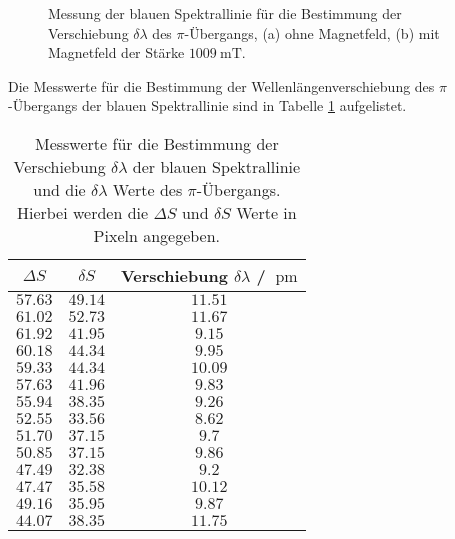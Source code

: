 \FloatBarrier
\begin{figure}
    \centering
    \vspace{0.1\textwidth}
    \caption{Messung der blauen Spektrallinie für die Bestimmung der Verschiebung $\delta \lambda$ des $\pi$-Übergangs, (a) ohne Magnetfeld, (b) mit Magnetfeld der Stärke $\SI{1009}{\milli\tesla}$.}
    \label{fig:blau_pi}
\end{figure}
\FloatBarrier
Die Messwerte für die Bestimmung der Wellenlängenverschiebung des $\pi$-Übergangs der blauen Spektrallinie sind in 
Tabelle \ref{tab:blau_pi} aufgelistet.
\FloatBarrier
\begin{table}
    \centering
    \caption{Messwerte für die Bestimmung der Verschiebung $\delta \lambda$ der blauen Spektrallinie und die $\delta\lambda$ Werte des $\pi$-Übergangs. Hierbei werden die $\Delta S$ und $\delta S$ Werte in Pixeln angegeben.}
    \label{tab:blau_pi}
    \begin{tabular}{c c c}
        \toprule
        $\Delta S$&$\delta S$&Verschiebung $\delta \lambda$ / $\SI{}{\pico\meter}$\\
        \midrule 
        $\num{57.63}$&$\num{49.14}$&$\num{11.51}$\\
        $\num{61.02}$&$\num{52.73}$&$\num{11.67}$\\
        $\num{61.92}$&$\num{41.95}$&$\num{9.15}$\\
        $\num{60.18}$&$\num{44.34}$&$\num{9.95}$\\
        $\num{59.33}$&$\num{44.34}$&$\num{10.09}$\\
        $\num{57.63}$&$\num{41.96}$&$\num{9.83}$\\
        $\num{55.94}$&$\num{38.35}$&$\num{9.26}$\\
        $\num{52.55}$&$\num{33.56}$&$\num{8.62}$\\
        $\num{51.70}$&$\num{37.15}$&$\num{9.7}$\\
        $\num{50.85}$&$\num{37.15}$&$\num{9.86}$\\
        $\num{47.49}$&$\num{32.38}$&$\num{9.2}$\\
        $\num{47.47}$&$\num{35.58}$&$\num{10.12}$\\
        $\num{49.16}$&$\num{35.95}$&$\num{9.87}$\\
        $\num{44.07}$&$\num{38.35}$&$\num{11.75}$\\

\end{tabular}
\end{table}
